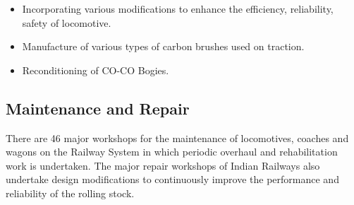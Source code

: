 \begin{itemize}
\item {\color[rgb]{0.0,0.0,0.039215688}
Incorporating various modifications to enhance the efficiency, reliability, safety of locomotive.}
\item {\color[rgb]{0.0,0.0,0.039215688}
Manufacture of various types of carbon brushes used on traction.}
\item {\color[rgb]{0.0,0.0,0.039215688}
Reconditioning of CO-CO Bogies.}
\end{itemize}

\bigskip

\subsection{Maintenance and Repair}

There are 46 major workshops for the maintenance of locomotives, coaches and wagons on the Railway
System in which periodic overhaul and rehabilitation work is undertaken. The major repair workshops of Indian Railways
also undertake design modifications to continuously improve the performance and reliability of the rolling stock.


